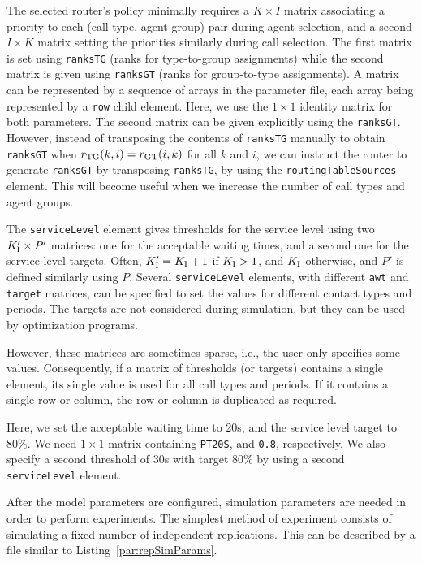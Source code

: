 The selected router's policy minimally requires a
$K\times I$ matrix associating a
priority to each (call type, agent group) pair during agent selection,
and
a second $I\times K$
matrix setting the priorities similarly during call
selection.
The first matrix is set using \texttt{ranksTG} (ranks for
type-to-group assignments)
while the second matrix is given using \texttt{ranksGT}
(ranks for group-to-type assignments).
A matrix can be represented by a sequence of arrays in the parameter
file, each array being represented by a \texttt{row} child element.
Here, we use the $1\times 1$ identity matrix for both parameters.
The second matrix can be given explicitly using the
\texttt{ranksGT}.
However, instead of transposing the contents of
\texttt{ranksTG} manually to obtain
\texttt{ranksGT} when $\rTG(k,i)=\rGT(i,k)$ for
all $k$ and $i$, we can instruct
the router to generate \texttt{ranksGT} by
transposing \texttt{ranksTG},
by using the \texttt{routing\-Table\-Sources} element.
This will become useful when we increase the number of call types and
agent groups.

The \texttt{service\-Level} element
gives thresholds for the service level using
two $K_{\mathrm{I}}'\times P'$
matrices: one for the acceptable waiting times, and a second one for the service
level targets.  Often, $K_{\mathrm{I}}'=K_{\mathrm{I}}+1$ if $K_{\mathrm{I}}>1$, and $K_{\mathrm{I}}$ otherwise,
and $P'$ is defined similarly using $P$.
Several \texttt{service\-Level} elements, with different
\texttt{awt} and \texttt{target} matrices, can
be specified to set the values for different contact types and
periods.
The targets are not considered during
simulation, but they can be used by
optimization programs.

However, these matrices are sometimes sparse, i.e., the user only
specifies some values.  Consequently, if a matrix of thresholds (or targets)
contains a single element, its single value is used for all call
types and periods.  If it contains a single row or column, the row or
column is duplicated as required.

Here, we set the acceptable waiting time to 20s, and the service level
target to 80\%.
We need $1\times 1$ matrix containing \texttt{PT20S}, and
\texttt{0.8}, respectively.
We also specify a second threshold of 30s with target 80\% by using a
second \texttt{service\-Level} element.

After the model parameters are configured, simulation parameters are
needed in order to perform experiments.
The simplest method of experiment consists of simulating a fixed
number of independent replications.  This can be described by a file
similar to
Listing~\ref{par:repSimParams}.

